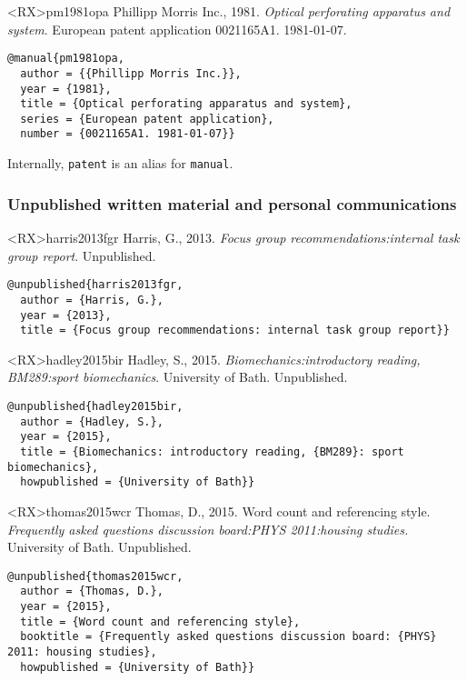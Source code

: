 \documentclass[10pt,a4paper]{article}
\newenvironment{info}{%
  \begin{list}{\makebox[2em][c]{\faInfoCircle}}{%
    \setlength{\leftmargin}{2em}
    \setlength{\labelwidth}{2em}
    \setlength{\labelsep}{0pt}}
}{\end{list}}
\begin{document}
\begin{bibexbox}<RX>{pm1981opa}
  Phillipp Morris Inc., 1981. \emph{Optical perforating apparatus and system}. European patent application 0021165A1. 1981-01-07.
  \tcblower
\begin{Verbatim}
@manual{pm1981opa,
  author = {{Phillipp Morris Inc.}},
  year = {1981},
  title = {Optical perforating apparatus and system},
  series = {European patent application},
  number = {0021165A1. 1981-01-07}}
\end{Verbatim}
\end{bibexbox}

\begin{info}\item Internally, \texttt{patent} is an alias for \texttt{manual}.\end{info}

\subsubsection*{Unpublished written material and personal communications}

\begin{bibexbox}<RX>{harris2013fgr}
  Harris, G., 2013. \emph{Focus group recommendations:\@ internal task group
  report}. Unpublished.
  \tcblower
\begin{Verbatim}
@unpublished{harris2013fgr,
  author = {Harris, G.},
  year = {2013},
  title = {Focus group recommendations: internal task group report}}
\end{Verbatim}
\end{bibexbox}

\begin{bibexbox}<RX>{hadley2015bir}
  Hadley, S., 2015. \emph{Biomechanics:\@ introductory reading, BM289:\@ sport
  biomechanics}. University of Bath. Unpublished.
  \tcblower
\begin{Verbatim}
@unpublished{hadley2015bir,
  author = {Hadley, S.},
  year = {2015},
  title = {Biomechanics: introductory reading, {BM289}: sport biomechanics},
  howpublished = {University of Bath}}
\end{Verbatim}
\end{bibexbox}

\begin{bibexbox}<RX>{thomas2015wcr}
  Thomas, D., 2015. Word count and referencing style. \emph{Frequently
  asked questions discussion board:\@ PHYS 2011:\@ housing studies.}
  University of Bath. Unpublished.
  \tcblower
\begin{Verbatim}
@unpublished{thomas2015wcr,
  author = {Thomas, D.},
  year = {2015},
  title = {Word count and referencing style},
  booktitle = {Frequently asked questions discussion board: {PHYS} 2011: housing studies},
  howpublished = {University of Bath}}
\end{Verbatim}
\end{bibexbox}
\end{document}
